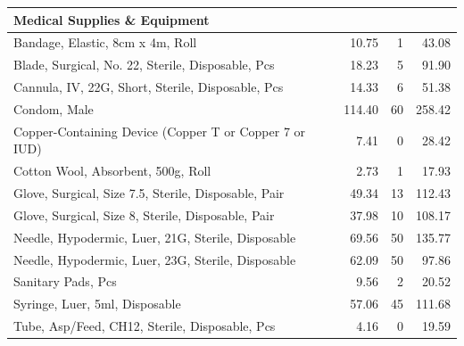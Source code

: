 \documentclass[12pt]{article}
\begin{document}
\begin{table}
\begin{tabular}{p{8cm} r r r}
\midrule
\multicolumn{4}{l}{\textbf{Medical Supplies \& Equipment}\hfill} \\
\midrule
Bandage, Elastic, 8cm x 4m, Roll & 10.75 & 1 & 43.08 \\
Blade, Surgical, No. 22, Sterile, Disposable, Pcs & 18.23 & 5 & 91.90 \\
Cannula, IV, 22G, Short, Sterile, Disposable, Pcs & 14.33 & 6 & 51.38 \\
Condom, Male & 114.40 & 60 & 258.42 \\
Copper-Containing Device (Copper T or Copper 7 or IUD) & 7.41 & 0 & 28.42 \\
Cotton Wool, Absorbent, 500g, Roll & 2.73 & 1 & 17.93 \\
Glove, Surgical, Size 7.5, Sterile, Disposable, Pair & 49.34 & 13 & 112.43 \\
Glove, Surgical, Size 8, Sterile, Disposable, Pair & 37.98 & 10 & 108.17 \\
Needle, Hypodermic, Luer, 21G, Sterile, Disposable & 69.56 & 50 & 135.77 \\
Needle, Hypodermic, Luer, 23G, Sterile, Disposable & 62.09 & 50 & 97.86 \\
Sanitary Pads, Pcs & 9.56 & 2 & 20.52 \\
Syringe, Luer, 5ml, Disposable & 57.06 & 45 & 111.68 \\
Tube, Asp/Feed, CH12, Sterile, Disposable, Pcs & 4.16 & 0 & 19.59 \\
\bottomrule
\end{tabular}
\end{table}
\end{document}
